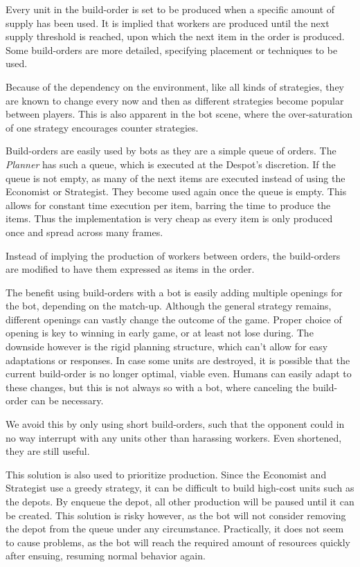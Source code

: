 Every unit in the build-order is set to be produced when a specific amount of supply has been used. It is implied that workers are produced until the next supply threshold is reached, upon which the next item in the order is produced. Some build-orders are more detailed, specifying placement or techniques to be used.

Because of the dependency on the environment, like all kinds of strategies, they are known to change every now and then as different strategies become popular between players. This is also apparent in the bot scene, where the over-saturation of one strategy encourages counter strategies. 

Build-orders are easily used by bots as they are a simple queue of orders. The \emph{Planner} has such a queue, which is executed at the Despot's discretion. If the queue is not empty, as many of the next items are executed instead of using the Economist or Strategist. They become used again once the queue is empty. This allows for constant time execution per item, barring the time to produce the items. Thus the implementation is very cheap as every item is only produced once and spread across many frames.

Instead of implying the production of workers between orders, the build-orders are modified to have them expressed as items in the order.

The benefit using build-orders with a bot is easily adding multiple openings for the bot, depending on the match-up. Although the general strategy remains, different openings can vastly change the outcome of the game. Proper choice of opening is key to winning in early game, or at least not lose during. The downside however is the rigid planning structure, which can't allow for easy adaptations or responses. In case some units are destroyed, it is possible that the current build-order is no longer optimal, viable even. Humans can easily adapt to these changes, but this is not always so with a bot, where canceling the build-order can be necessary.

We avoid this by only using short build-orders, such that the opponent could in no way interrupt with any units other than harassing workers. Even shortened, they are still useful.

This solution is also used to prioritize production. Since the Economist and Strategist use a greedy strategy, it can be difficult to build high-cost units such as the depots. By enqueue the depot, all other production will be paused until it can be created. This solution is risky however, as the bot will not consider removing the depot from the queue under any circumstance. Practically, it does not seem to cause problems, as the bot will reach the required amount of resources quickly after ensuing, resuming normal behavior again.

